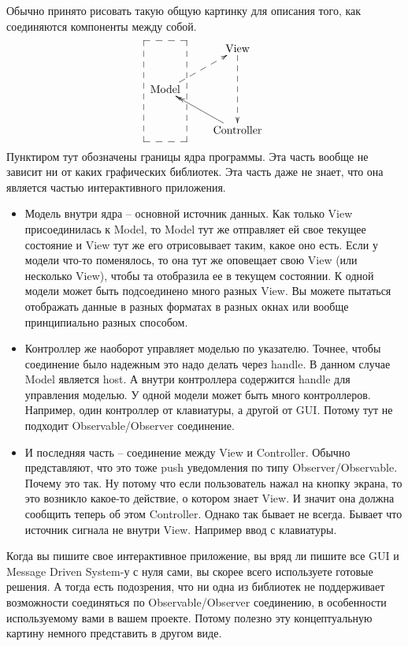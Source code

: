 Обычно принято рисовать такую общую картинку для описания того, как соединяются компоненты между собой.
\[
\xymatrix{
  {\phantom{\text{Model}}}
  {\save
  [].[dd]*+[F--]\frm{}
  \restore
  }  
  &{\text{View}}\ar@{-->}[dd]\\
  {\text{Model}}\ar@{-->}[ru]&{}\\
  {}&{\text{Controller}}\ar@{->>}[lu]\\
}
\]
Пунктиром тут обозначены границы ядра программы.
Эта часть вообще не зависит ни от каких графических библиотек.
Эта часть даже не знает, что она является частью интерактивного приложения.
\begin{itemize}
\item
Модель внутри ядра -- основной источник данных.
Как только View присоединилась к Model, то Model тут же отправляет ей свое текущее состояние и View тут же его отрисовывает таким, какое оно есть.
Если у модели что-то поменялось, то она тут же оповещает свою View (или несколько View), чтобы та отобразила ее в текущем состоянии.
К одной модели может быть подсоединено много разных View.
Вы можете пытаться отображать данные в разных форматах в разных окнах или вообще принципиально разных способом.

\item
Контроллер же наоборот управляет моделью по указателю.
Точнее, чтобы соединение было надежным это надо делать через handle.
В данном случае Model является host.
А внутри контроллера содержится handle для управления моделью.
У одной модели может быть много контроллеров.
Например, один контроллер от клавиатуры, а другой от GUI.
Потому тут не подходит Observable/Observer соединение.

\item
И последняя часть -- соединение между View и Controller.
Обычно представляют, что это тоже push уведомления по типу Observer/Observable.
Почему это так.
Ну потому что если пользователь нажал на кнопку экрана, то это возникло какое-то действие, о котором знает View.
И значит она должна сообщить теперь об этом Controller.
Однако так бывает не всегда.
Бывает что источник сигнала не внутри View.
Например ввод с клавиатуры.
\end{itemize}
Когда вы пишите свое интерактивное приложение, вы вряд ли пишите все GUI и Message Driven System-у с нуля сами, вы скорее всего используете готовые решения.
А тогда есть подозрения, что ни одна из библиотек не поддерживает возможности соединяться по Observable/Observer соединению, в особенности используемому вами в вашем проекте.
Потому полезно эту концептуальную картину немного представить в другом виде.

